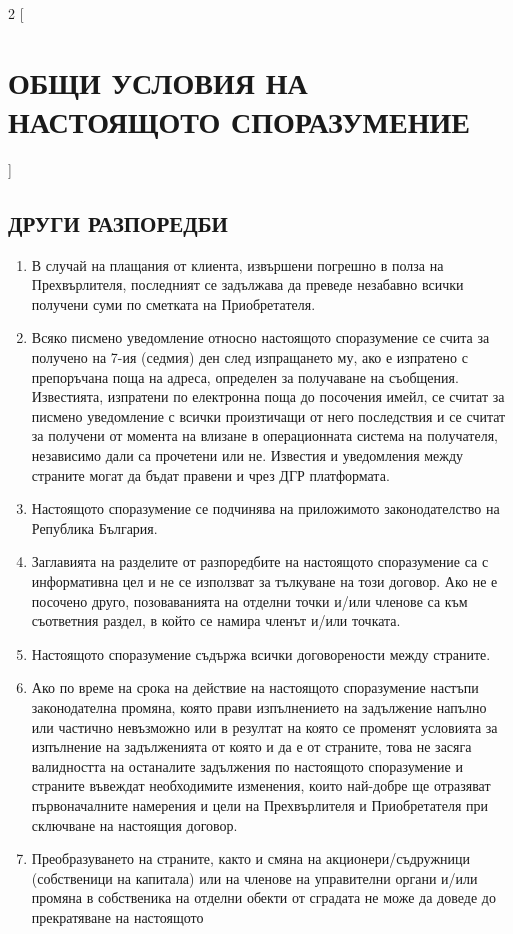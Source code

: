 \begin{multicols}{2} [\section{ОБЩИ УСЛОВИЯ НА НАСТОЯЩОТО
    СПОРАЗУМЕНИЕ}]
  \subsection{ДРУГИ РАЗПОРЕДБИ}
  \begin{enumerate}
  \item В случай на плащания от клиента, извършени погрешно в полза на
    Прехвърлителя, последният се задължава да преведе незабавно всички
    получени суми по сметката на Приобретателя.
  \item Всяко писмено уведомление относно настоящото споразумение се
    счита за получено на 7-ия (седмия) ден след изпращането му, ако е
    изпратено с препоръчана поща на адреса, определен за получаване на
    съобщения. Известията, изпратени по електронна поща до посочения
    имейл, се считат за писмено уведомление с всички произтичащи от
    него последствия и се считат за получени от момента на влизане в
    операционната система на получателя, независимо дали са прочетени
    или не. Известия и уведомления между страните могат да бъдат
    правени и чрез ДГР платформата.
  \item Настоящото споразумение се подчинява на приложимото
    законодателство на Република България.
  \item Заглавията на разделите от разпоредбите на настоящото
    споразумение са с информативна цел и не се използват за тълкуване
    на този договор. Ако не е посочено друго, позоваванията на отделни
    точки и/или членове са към съответния раздел, в който се намира
    членът и/или точката.
  \item Настоящото споразумение съдържа всички договорености между
    страните.
  \item Ако по време на срока на действие на настоящото споразумение
    настъпи законодателна промяна, която прави изпълнението на
    задължение напълно или частично невъзможно или в резултат на която
    се променят условията за изпълнение на задълженията от която и да
    е от страните, това не засяга валидността на останалите задължения
    по настоящото споразумение и страните въвеждат необходимите
    изменения, които най-добре ще отразяват първоначалните намерения и
    цели на Прехвърлителя и Приобретателя при сключване на настоящия
    договор.
  \item Преобразуването на страните, както и смяна на
    акционери/съдружници (собственици на капитала) или на членове на
    управителни органи и/или промяна в собственика на отделни обекти
    от сградата не може да доведе до прекратяване на настоящото

\end{enumerate}
\end{multicols}
